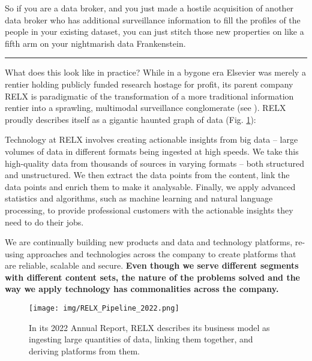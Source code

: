 So if you are a data broker, and you just made a hostile acquisition of
another data broker who has additional surveillance information to fill
the profiles of the people in your existing dataset, you can just stitch
those new properties on like a fifth arm on your nightmarish data
Frankenstein.

\begin{center}\rule{0.5\linewidth}{0.5pt}\end{center}

What does this look like in practice? While in a bygone era Elsevier was
merely a rentier holding publicly funded research hostage for profit,
its parent company RELX is paradigmatic of the transformation of a more
traditional information rentier into a sprawling, multimodal
surveillance conglomerate (see \cite{lamdanDataCartelsCompanies2023} ). RELX proudly describes itself as a gigantic haunted graph of
data (Fig. \ref{fig:relx}):

\begin{leftbar}
Technology at RELX involves creating actionable insights from big data
-- large volumes of data in different formats being ingested at high
speeds. We take this high-quality data from thousands of sources in
varying formats -- both structured and unstructured. We then extract the
data points from the content, link the data points and enrich them to
make it analysable. Finally, we apply advanced statistics and
algorithms, such as machine learning and natural language processing, to
provide professional customers with the actionable insights they need to
do their jobs.

We are continually building new products and data and technology
platforms, re-using approaches and technologies across the company to
create platforms that are reliable, scalable and secure. \textbf{Even
though we serve different segments with different content sets, the
nature of the problems solved and the way we apply technology has
commonalities across the company.} \cite{relxAnnualReport20222023} 
\end{leftbar}

\begin{figure}[h!]
\texttt{[image: img/RELX\_Pipeline\_2022.png]}

\caption{In its 2022 Annual Report, RELX describes its business model as
ingesting large quantities of data, linking them together, and deriving
platforms from them. \cite{relxAnnualReport20222023} }
\label{fig:relx}
\end{figure}

